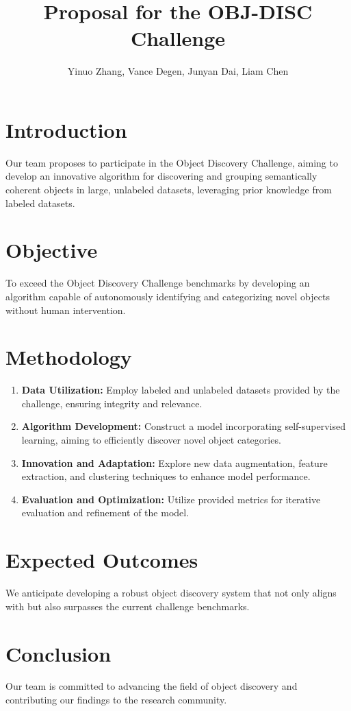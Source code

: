 \documentclass{article}
\title{Proposal for the OBJ-DISC Challenge}
\author{Yinuo Zhang, Vance Degen, Junyan Dai, Liam Chen}
\date{}
\begin{document}
	
	\maketitle
	
	\section*{Introduction}
	Our team proposes to participate in the Object Discovery Challenge, aiming to develop an innovative algorithm for discovering and grouping semantically coherent objects in large, unlabeled datasets, leveraging prior knowledge from labeled datasets.
	
	\section*{Objective}
	To exceed the Object Discovery Challenge benchmarks by developing an algorithm capable of autonomously identifying and categorizing novel objects without human intervention.
	
	\section*{Methodology}
	\begin{enumerate}
		\item \textbf{Data Utilization:} Employ labeled and unlabeled datasets provided by the challenge, ensuring integrity and relevance.
		\item \textbf{Algorithm Development:} Construct a model incorporating self-supervised learning, aiming to efficiently discover novel object categories.
		\item \textbf{Innovation and Adaptation:} Explore new data augmentation, feature extraction, and clustering techniques to enhance model performance.
		\item \textbf{Evaluation and Optimization:} Utilize provided metrics for iterative evaluation and refinement of the model.
	\end{enumerate}
	
	\section*{Expected Outcomes}
	We anticipate developing a robust object discovery system that not only aligns with but also surpasses the current challenge benchmarks.
	
	\section*{Conclusion}
	Our team is committed to advancing the field of object discovery and contributing our findings to the research community.
	
\end{document}
